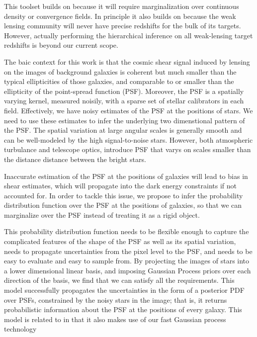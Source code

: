 \documentclass[12pt]{article}
\begin{document}
This toolset builds on  because it will require
marginalization over continuous density or convergence fields.
In principle it also builds on  because the weak
lensing community will never have precise redshifts for the bulk of
its targets.
However, actually performing the hierarchical inference on all
weak-lensing target redshifts is beyond our current scope.

The baic context for this work is that the cosmic shear signal induced
by lensing on the images of background galaxies is coherent but much
smaller than the typical ellipticities of those galaxies, and comparable
to or smaller than the ellipticity of the point-spread function (PSF).
Moreover, the PSF is a spatially varying kernel, measured noisily,
with a sparse set of stellar calibrators in each field.
Effectively, we have 
noisy estimates of the PSF at the positions of stars. We need to use these estimates to infer the
underlying two dimenstional pattern of the PSF. The spatial variation at large angular scales is 
generally smooth and can be well-modeled by the high signal-to-noise stars. However, both atmospheric
turbulance and telescope optics, introduce PSF that varys on scales smaller than the distance
distance between the bright stars. 

Inaccurate estimation of the PSF at the positions of galaxies will lead to bias in shear estimates,
which will propagate into the dark energy constraints if not accounted for. In order to
tackle this issue, we propose to infer the probability distribution function over the PSF
at the positions of galaxies, so that we can marginalize over the PSF instead of treating it 
as a rigid object.

This probability distribution function needs to be flexible enough to capture the complicated 
features of the shape of the PSF as well as its spatial variation, needs to propagate uncertainties
from the pixel level to the PSF, and needs to be easy to evaluate and easy to sample from. By 
projecting the images of stars into a lower dimensional linear basis, and imposing Gaussian Process priors 
over each direction of the basis, we find that we can satisfy all the requirements. This model successfully propagates
the uncertainties in the form of a posterior PDF over PSFs, constrained by the noisy stars in the image; 
that is, it returns probabilistic information about the PSF at the positions of every galaxy.
This model is related to  in that it also makes use
of our fast Gaussian process technology
\end{document}
